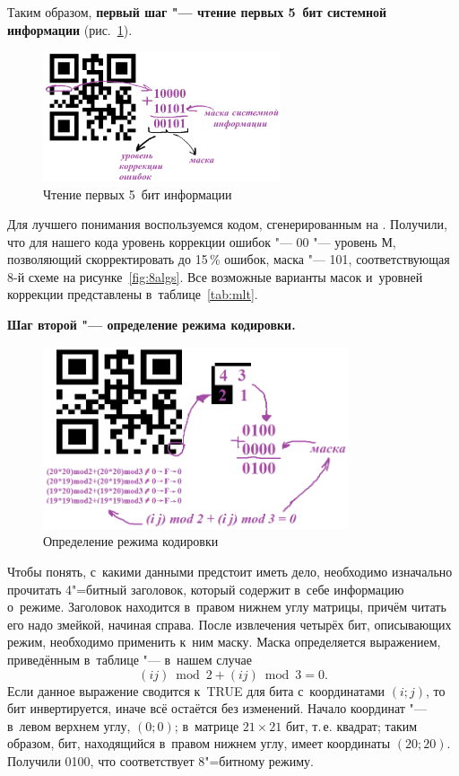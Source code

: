\documentclass[final,pdftex]{../../template/epsilonj}
\begin{document}
Таким образом, \textbf{первый шаг "--- чтение первых 5~бит системной информации} (рис.~\ref{fig:fivebits}).
\begin{figure}[htbp]
	\includegraphics[width=70mm]{1.png}
	\caption{Чтение первых 5~бит информации}\label{fig:fivebits}
\end{figure}

Для лучшего понимания воспользуемся кодом, сгенерированным на \href{http://qrcoder.ru}{}. Получили, что для нашего кода уровень коррекции ошибок "--- 00 "--- уровень М, позволяющий скорректировать до 15\,\% ошибок, маска "--- 101, соответствующая 8-й схеме на рисунке~\ref{fig:8algs}. Все возможные варианты масок и~уровней коррекции представлены в~таблице~\ref{tab:mlt}.

\textbf{Шаг второй "--- определение режима кодировки.}
\begin{figure}[hbt]
	\includegraphics[width=90mm]{21.png}
	\caption{Определение режима кодировки}
\end{figure}

Чтобы понять, с~какими данными предстоит иметь дело, необходимо изначально прочитать 4"=битный заголовок, который содержит в~себе информацию о~режиме. Заголовок находится в~правом нижнем углу матрицы, причём читать его надо змейкой, начиная справа. После извлечения четырёх бит, описывающих режим, необходимо применить к~ним маску. Маска определяется выражением, приведённым в~таблице "--- в~нашем случае
\[
(i j) \bmod 2 + (i j) \bmod 3 = 0.
\]
Если данное выражение сводится к~\textsf{TRUE} для бита с~координатами $(i;j)$, то бит инвертируется, иначе всё остаётся без изменений. Начало координат "--- в~левом верхнем углу, $(0;0)$; в~матрице $21\times21$ бит, т.\,е. квадрат; таким образом, бит, находящийся в~правом нижнем углу, имеет координаты $(20;20)$. Получили 0100, что соответствует 8"=битному режиму.
\end{document}
